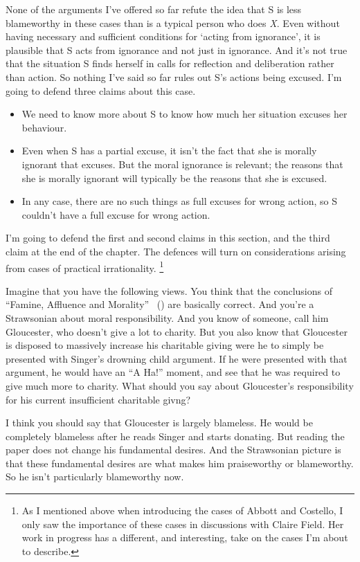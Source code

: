 \documentclass[
  10pt,
  letterpaper,
  twoside]{scrbook}
\providecommand{\tightlist}{%
  \setlength{\itemsep}{0pt}\setlength{\parskip}{0pt}}\usepackage{longtable,booktabs,array}
\begin{document}
None of the arguments I've offered so far refute the idea that S is less
blameworthy in these cases than is a typical person who does \emph{X}.
Even without having necessary and sufficient conditions for `acting from
ignorance', it is plausible that S acts from ignorance and not just in
ignorance. And it's not true that the situation S finds herself in calls
for reflection and deliberation rather than action. So nothing I've said
so far rules out S's actions being excused. I'm going to defend three
claims about this case.

\begin{itemize}
\tightlist
\item
  We need to know more about S to know how much her situation excuses
  her behaviour.
\item
  Even when S has a partial excuse, it isn't the fact that she is
  morally ignorant that excuses. But the moral ignorance is relevant;
  the reasons that she is morally ignorant will typically be the reasons
  that she is excused.
\item
  In any case, there are no such things as full excuses for wrong
  action, so S couldn't have a full excuse for wrong action.
\end{itemize}

I'm going to defend the first and second claims in this section, and the
third claim at the end of the chapter. The defences will turn on
considerations arising from cases of practical irrationality.
\footnote{As I mentioned above when introducing the cases of {Abbott}
  and {Costello}, I only saw the importance of these cases in
  discussions with Claire Field. Her work in progress has a different,
  and interesting, take on the cases I'm about to describe.}

Imagine that you have the following views. You think that the
conclusions of ``Famine, Affluence and Morality''
~() are basically correct. And
you're a Strawsonian about moral responsibility. And you know of
someone, call him {Gloucester}, who doesn't give a lot to charity. But
you also know that {Gloucester} is disposed to massively increase his
charitable giving were he to simply be presented with Singer's drowning
child argument. If he were presented with that argument, he would have
an ``A Ha!'' moment, and see that he was required to give much more to
charity. What should you say about {Gloucester}'s responsibility for his
current insufficient charitable givng?

I think you should say that {Gloucester} is largely blameless. He would
be completely blameless after he reads Singer and starts donating. But
reading the paper does not change his fundamental desires. And the
Strawsonian picture is that these fundamental desires are what makes him
praiseworthy or blameworthy. So he isn't particularly blameworthy now.
\end{document}
